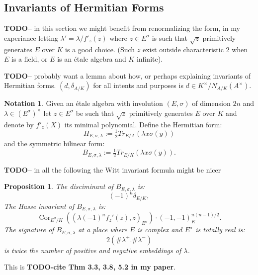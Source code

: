 \documentclass{article}
\theoremstyle{plain}
\newtheorem{proposition}[theorem]{Proposition}
\theoremstyle{definition}
\newtheorem{notation}[theorem]{Notation}
\DeclareMathOperator{\Cor}{Cor}
\newcommand{\TODO}[1]{\textbf{TODO-#1}}
\begin{document}
\subsection{Invariants of Hermitian Forms}

\TODO - in this section we might benefit from renormalizing the form, in my experiance letting $\lambda' = \lambda/f'_z(z)$ where $z\in E^\sigma$ is such that $\sqrt{z}$ primitively generates $E$ over $K$ is a good choice.
(Such $z$ exist outside characteristic $2$ when $E$ is a field, or $E$ is an \'etale algebra and $K$ infinite).

\TODO - probably want a lemma about how, or perhaps explaining invariants of Hermitian forms.
$(d,\delta_{A/K}) $ for all intents and purposes is $d \in K^\times/N_{A/K}(A^\times)$.

\begin{notation}
Given an \'etale algebra with involution $(E,\sigma)$ of dimension $2n$ and $\lambda \in (E^\sigma)^\times$ let $z\in E^\sigma$ be such that $\sqrt{z}$ primitively generates $E$ over $K$ and denote by $f'_z(X)$ its minimal polynomial.
Define the Hermitian form:
\[ H_{E,\sigma,\lambda} := \tfrac{1}{2}Tr_{E/A}\left(\lambda x\sigma(y)\right) \]
and the symmetric bilinear form:
\[ B_{E,\sigma,\lambda} := \tfrac{1}{2}Tr_{E/K}\left(\lambda x\sigma(y)\right). \]
\end{notation}

\TODO - in all the following the Witt invariant formula might be nicer

\begin{proposition}\label{prop:Hasse}
The disciminant of $B_{E,\sigma,\lambda}$ is:
\[  (-1)^n\delta_{E/K}, \]
The Hasse invariant of $B_{E,\sigma,\lambda}$ is:
\[  \Cor_{E^\sigma/K}((\lambda (-1)^n f_z'(z), z)_{E^\sigma})\cdot(-1,-1)_K^{n(n-1)/2}.\] 
The signature of $B_{E,\sigma,\lambda}$ at a place where $E$ is complex and $E^\sigma$ is totally real is:
\[ 2(\#\lambda^+. \#\lambda^-) \]
is twice the number of positive and negative embeddings of $\lambda$.
\end{proposition}
This is \TODO{cite Thm 3.3, 3.8, 5.2 in my paper}.
\end{document}
